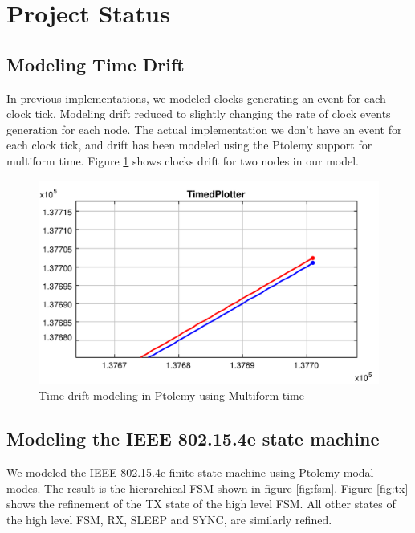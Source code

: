 \section{Project Status}
\label{sec:project-status}

\subsection{Modeling Time Drift}
\label{sec:modeling-time-drift}
In previous implementations, we modeled clocks generating an event for each clock tick. Modeling drift reduced to slightly changing the rate of clock events generation for each node.
The actual implementation we don't have an event for each clock tick, and drift has been modeled using the Ptolemy support for multiform time. Figure \ref{fig:time} shows clocks drift for two nodes in our model.

\begin{figure}
  \centering
  \includegraphics[width=\textwidth]{figures/time-drift.pdf}
  \caption{Time drift modeling in Ptolemy using Multiform time}
  \label{fig:time}
\end{figure}

\subsection{Modeling the IEEE 802.15.4e state machine}
\label{sec:modeling-state-machine}

We modeled the IEEE 802.15.4e finite state machine using Ptolemy modal modes. The result is the hierarchical FSM shown in figure \ref{fig:fsm}. Figure \ref{fig:tx} shows the refinement of the TX state of the high level FSM. All other states of the high level FSM, RX, SLEEP and SYNC, are similarly refined.

